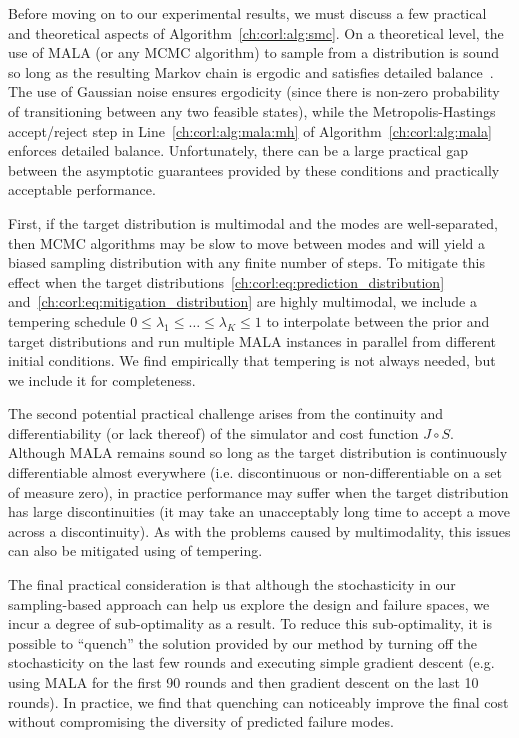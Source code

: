{Before moving on to our experimental results, we must discuss a few practical and theoretical aspects of Algorithm~\ref{ch:corl:alg:smc}. On a theoretical level, the use of MALA (or any MCMC algorithm) to sample from a distribution is sound so long as the resulting Markov chain is ergodic and satisfies detailed balance~\cite{aiama}. The use of Gaussian noise ensures ergodicity (since there is non-zero probability of transitioning between any two feasible states), while the Metropolis-Hastings accept/reject step in Line~\ref{ch:corl:alg:mala:mh} of Algorithm~\ref{ch:corl:alg:mala} enforces detailed balance. Unfortunately, there can be a large practical gap between the asymptotic guarantees provided by these conditions and practically acceptable performance.

First, if the target distribution is multimodal and the modes are well-separated, then MCMC algorithms may be slow to move between modes and will yield a biased sampling distribution with any finite number of steps. To mitigate this effect when the target distributions~\eqref{ch:corl:eq:prediction_distribution} and~\eqref{ch:corl:eq:mitigation_distribution} are highly multimodal, we include a tempering schedule $0 \leq \lambda_1 \leq \ldots \leq \lambda_K \leq 1$ to interpolate between the prior and target distributions and run multiple MALA instances in parallel from different initial conditions. We find empirically that tempering is not always needed, but we include it for completeness.

The second potential practical challenge arises from the continuity and differentiability (or lack thereof) of the simulator and cost function $J \circ S$. Although MALA remains sound so long as the target distribution is continuously differentiable almost everywhere (i.e. discontinuous or non-differentiable on a set of measure zero), in practice performance may suffer when the target distribution has large discontinuities (it may take an unacceptably long time to accept a move across a discontinuity). As with the problems caused by multimodality, this issues can also be mitigated using of tempering.

The final practical consideration is that although the stochasticity in our sampling-based approach can help us explore the design and failure spaces, we incur a degree of sub-optimality as a result. To reduce this sub-optimality, it is possible to ``quench'' the solution provided by our method by turning off the stochasticity on the last few rounds and executing simple gradient descent (e.g. using MALA for the first 90 rounds and then gradient descent on the last 10 rounds). In practice, we find that quenching can noticeably improve the final cost without compromising the diversity of predicted failure modes.

}

